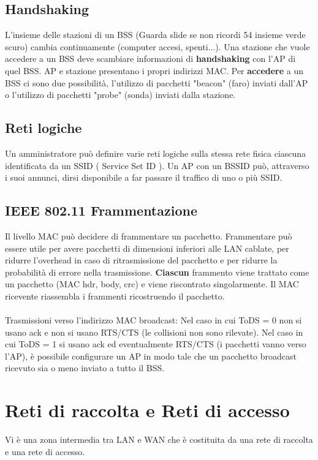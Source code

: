 \documentclass{article}
\begin{document}
\subsection{Handshaking}
L'insieme delle stazioni di un BSS (Guarda slide se non ricordi 54 insieme verde scuro) cambia continuamente (computer accesi, spenti...). Una stazione che vuole accedere a un BSS deve scambiare informazioni di \textbf{handshaking} con l'AP di quel BSS. AP e stazione presentano i propri indirizzi MAC. Per \textbf{accedere} a un BSS ci sono due possibilità, l'utilizzo di pacchetti "beacon" (faro) inviati dall'AP o l'utilizzo di pacchetti "probe" (sonda) inviati dalla stazione.
\subsection{Reti logiche}
Un amministratore può definire varie reti logiche sulla stessa rete fisica ciascuna identificata da un SSID ( Service Set ID ). Un AP con un BSSID può, attraverso i suoi annunci, dirsi disponibile a far passare il traffico di uno o più SSID.
\subsection{IEEE 802.11 Frammentazione}
Il livello MAC può decidere di frammentare un pacchetto. Frammentare può essere utile per avere pacchetti di dimensioni inferiori alle LAN cablate, per ridurre l'overhead in caso di ritrasmissione del pacchetto e per ridurre la probabilità di errore nella trasmissione. \textbf{Ciascun} frammento viene trattato come un pacchetto (MAC hdr, body, crc) e viene riscontrato singolarmente. Il MAC ricevente riassembla i frammenti ricostruendo il pacchetto.\\\\
Trasmissioni verso l'indirizzo MAC broadcast: Nel caso in cui ToDS = 0 non si usano ack e non si usano RTS/CTS (le collisioni non sono rilevate). Nel caso in cui ToDS = 1 si usano ack ed eventualmente RTS/CTS (i pacchetti vanno verso l'AP), è possibile configurare un AP in modo tale che un pacchetto broadcast ricevuto sia o meno inviato a tutto il BSS.
\section{Reti di raccolta e Reti di accesso}
Vi è una zona intermedia tra LAN e WAN che è costituita da una rete di raccolta e una rete di accesso.
\end{document}

